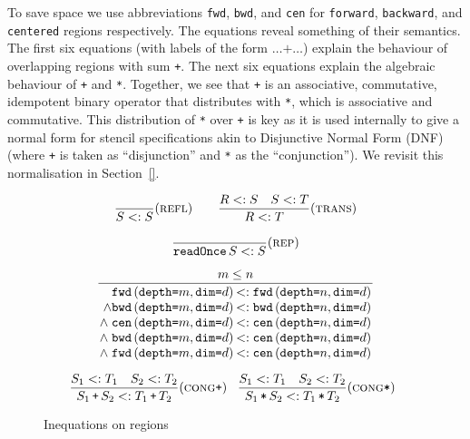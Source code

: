 \documentclass[9pt]{sigplanconf}
\theoremstyle{definition}
\newcommand{\term}[1]{\texttt{#1}}
\newcommand{\stenFwdS}[2]{\term{fwd} \, (\term{depth=}#1,
  \term{dim=}#2)}
\newcommand{\stenBwdS}[2]{\term{bwd} \, (\term{depth=}#1,
  \term{dim=}#2)}
\newcommand{\stenCenS}[2]{\term{cen} \, (\term{depth=}#1,
  \term{dim=}#2)}
\begin{document}
To save space we use abbreviations 
\term{fwd}, \term{bwd}, and \term{cen} for \term{forward},
\term{backward}, and \term{centered} regions respectively.  The
equations reveal something of their semantics.  The first six
equations (with labels of the form $\ldots \texttt{+} \ldots$) 
explain the behaviour of overlapping regions with sum
\term{+}. The next six equations explain the algebraic behaviour of
\term{+} and \term{*}.  Together, we see that \term{+} is an
associative, commutative, idempotent binary operator that distributes
with \term{*}, which is associative and commutative. This distribution
of \term{*} over \term{+} is key as it is used internally to give a
normal form for stencil specifications akin to Disjunctive Normal Form
(DNF) (where \term{+} is taken as ``disjunction'' and \term{*} as the
``conjunction''). We revisit this normalisation in Section~\ref{}.

\begin{figure}[t]
\begin{align*}
\begin{array}{c}
\dfrac{}{S <: S}(\textsc{refl}) \qquad \dfrac{R <: S \quad S <: T}{R <:
  T}(\textsc{trans}) \\[1.5em]
\dfrac{}{\texttt{readOnce} \, S <: S}(\textsc{rep})
\\[1.5em]
\setlength{\arraycolsep}{0.1em}
\dfrac{\hspace{3em} m \leq n \hspace{3em}}
{\begin{array}{rl}
\stenFwdS{m}{d} & <: \stenFwdS{n}{d}
\\
\wedge \stenBwdS{m}{d} & <: \stenBwdS{n}{d}
\\
\wedge \; \stenCenS{m}{d} & <: \stenCenS{n}{d}
\\
\wedge \; \stenBwdS{m}{d} & <: \stenCenS{n}{d} \\
\wedge \; \stenFwdS{m}{d} & <: \stenCenS{n}{d} \\[1em]
\end{array}} \\[2.5em]
\hspace{-0.5em}
\dfrac{S_1 <: T_1 \quad S_2 <: T_2} 
      {S_1 \, \texttt{+} \, S_2 <: T_1 \, \texttt{+} \, T_2}
(\textsc{cong}\texttt{+}) \;\;\;
\dfrac{S_1 <: T_1 \quad S_2 <: T_2} 
      {S_1 \, \texttt{*} \, S_2 <: T_1 \, \texttt{*} \, T_2}
(\textsc{cong}\texttt{*})
\end{array}
\end{align*}
\caption{Inequations on regions}
\label{fig:inequations}
\end{figure}
\end{document}
